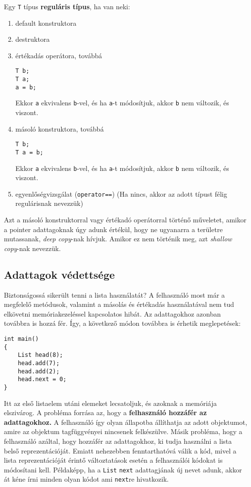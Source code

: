 \documentclass[a4paper,11.5pt,table]{article}
\begin{document}
	Egy \texttt{T} típus \textbf{reguláris típus}, ha van neki:
	\begin{enumerate}
		\item default konstruktora
		\item destruktora
		\item értékadás operátora, továbbá
		\begin{lstlisting}
T b;
T a;
a = b;
		\end{lstlisting}
		Ekkor \texttt{a} ekvivalens \texttt{b}-vel, és ha \texttt{a}-t módosítjuk, akkor \texttt{b} nem változik, és viszont.
		\item másoló konstruktora, továbbá
		\begin{lstlisting}
T b;
T a = b;
		\end{lstlisting}
		Ekkor \texttt{a} ekvivalens \texttt{b}-vel, és ha \texttt{a}-t módosítjuk, akkor \texttt{b} nem változik, és viszont.
		\item egyenlőségvizsgálat (\texttt{operator==}) (Ha nincs, akkor az adott típust félig regulárisnak nevezzük)
	\end{enumerate}
	\begin{note}
		Azt a másoló konstruktorral vagy értékadó operátorral történő műveletet, amikor a pointer adattagoknak úgy adunk értékül, hogy ne ugyanarra a területre mutassanak, \textit{deep copy}-nak hívjuk. Amikor ez nem történik meg, azt \textit{shallow copy}-nak nevezzük.
	\end{note}
	\subsection{Adattagok védettsége}
	Biztonságossá sikerült tenni a lista használatát? A felhasználó most már a megfelelő metódusok, valamint a másolás és értékadás használatával nem tud elkövetni memóriakezeléssel kapcsolatos hibát. Az adattagokhoz azonban továbbra is hozzá fér. Így, a következő módon továbbra is érhetik meglepetések:
	\begin{lstlisting}
int main()
{
	List head(8);
	head.add(7);
	head.add(2);
	head.next = 0;
}
	\end{lstlisting}
	Itt az első listaelem utáni elemeket lecsatoljuk, és azoknak a memóriája elszivárog. A probléma forrása az, hogy a \textbf{felhasználó hozzáfér az adattagokhoz.} A felhasználó így olyan állapotba állíthatja az adott objektumot, amire az objektum tagfüggvényei nincsenek felkészülve. Másik probléma, hogy a felhasználó azáltal, hogy hozzáfér az adattagokhoz, ki tudja használni a lista belső reprezentációját. Emiatt nehezebben fenntarthatóvá válik a kód, mivel a lista reprezentációját érintő változtatások esetén a felhasználói kódokat is módosítani kell. Példaképp, ha a \texttt{List} \texttt{next} adattagjának új nevet adunk, akkor át kéne írni minden olyan kódot ami \texttt{next}re hivatkozik.
	
\end{document}
